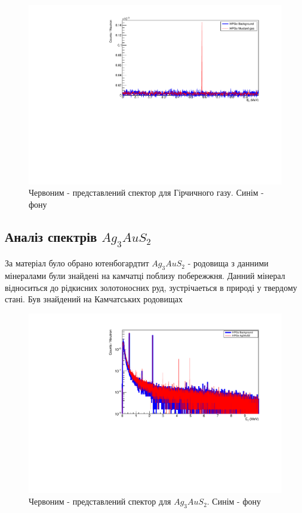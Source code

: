 \documentclass[a4paper, 14pt]{article}
\numberwithin{equation}{section}
\numberwithin{table}{section}
\begin{document}
	\begin{figure}[hbt!]
		\centering \includegraphics[width=1\textwidth]{res/mustFon89.pdf}
		\caption{Червоним - представлений спектор для Гірчичного газу. Синім - фону} 
		\label{ris:MustFon89}	
	\end{figure} 
	
\newpage

\subsection{Аналіз спектрів $Ag_3AuS_2$}

	За матеріал було обрано ютенбогардтит $Ag_3AuS_2$ - родовища з данними мінералами були знайдені на камчатці поблизу побережжня. Данний мінерал відноситься до рідкисних золотоносних руд, зустрічаеться в природі у твердому стані. Був знайдений на Камчатських родовищах
	
	\begin{figure}[hbt!]
		\centering \includegraphics[width=1\textwidth]{res/auFonAllLog.pdf}
		\caption{Червоним - представлений спектор для $Ag_3AuS_2$. Синім - фону} 
		\label{ris:Ag3AuS2Fon}	
	\end{figure} 	
\end{document}
